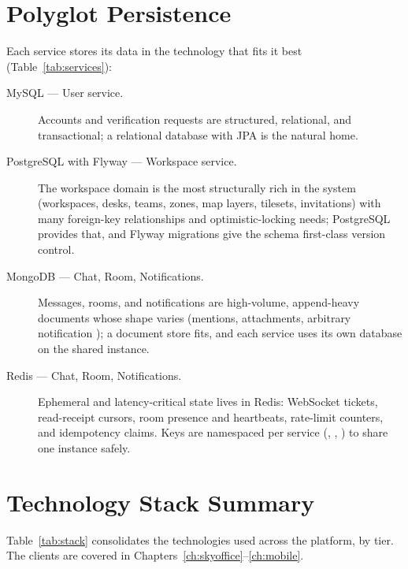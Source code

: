 \section{Polyglot Persistence}

Each service stores its data in the technology that fits it best
(Table~\ref{tab:services}):

\begin{description}
  \item[MySQL --- User service.] Accounts and verification requests are
  structured, relational, and transactional; a relational database with JPA is
  the natural home.
  \item[PostgreSQL with Flyway --- Workspace service.] The workspace domain is
  the most structurally rich in the system (workspaces, desks, teams, zones, map
  layers, tilesets, invitations) with many foreign-key relationships and
  optimistic-locking needs; PostgreSQL provides that, and Flyway migrations give
  the schema first-class version control.
  \item[MongoDB --- Chat, Room, Notifications.] Messages, rooms, and
  notifications are high-volume, append-heavy documents whose shape varies
  (mentions, attachments, arbitrary notification ); a document store
  fits, and each service uses its own database on the shared instance.
  \item[Redis --- Chat, Room, Notifications.] Ephemeral and latency-critical
  state lives in Redis: WebSocket tickets, read-receipt cursors, room presence
  and heartbeats, rate-limit counters, and idempotency claims. Keys are
  namespaced per service (, , ) to share
  one instance safely.
\end{description}

\section{Technology Stack Summary}

Table~\ref{tab:stack} consolidates the technologies used across the platform, by
tier. The clients are covered in Chapters~\ref{ch:skyoffice}--\ref{ch:mobile}.

